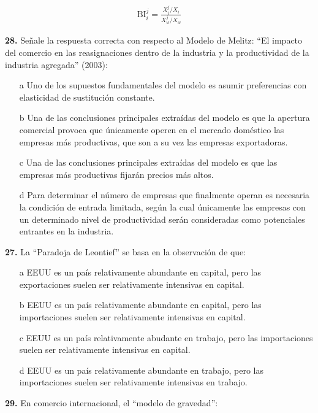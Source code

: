 \documentclass{nuevotema}
\begin{document}
\begin{align*}
\text{BI}_i^j = \frac{X_i^j / X_i}{X_w^j / X_w}
\end{align*}


\preguntas


\textbf{28.} Señale la respuesta correcta con respecto al Modelo de Melitz: ``El impacto del comercio en las reasignaciones dentro de la industria y la productividad de la industria agregada'' (2003):

\begin{itemize}
	\item[a] Uno de los supuestos fundamentales del modelo es asumir preferencias con elasticidad de sustitución constante.
	\item[b] Una de las conclusiones principales extraídas del modelo es que la apertura comercial provoca que únicamente operen en el mercado doméstico las empresas más productivas, que son a su vez las empresas exportadoras.
	\item[c] Una de las conclusiones principales extraídas del modelo es que las empresas más productivas fijarán precios más altos.
	\item[d] Para determinar el número de empresas que finalmente operan es necesaria la condición de entrada limitada, según la cual únicamente las empresas con un determinado nivel de productividad serán consideradas como potenciales entrantes en la industria.
\end{itemize}

\textbf{27.} La ``Paradoja de Leontief'' se basa en la observación de que:

\begin{itemize}
	\item[a] EEUU es un país relativamente abundante en capital, pero las exportaciones suelen ser relativamente intensivas en capital.
	\item[b] EEUU es un país relativamente abundante en capital, pero las importaciones suelen ser relativamente intensivas en capital.
	\item[c] EEUU es un país relativamente abudante en trabajo, pero las importaciones suelen ser relativamente intensivas en capital.
	\item[d] EEUU es un país relativamente abundante en trabajo, pero las importaciones suelen ser relativamente intensivas en trabajo.
\end{itemize}

\textbf{29.} En comercio internacional, el ``modelo de gravedad'':
\end{document}
